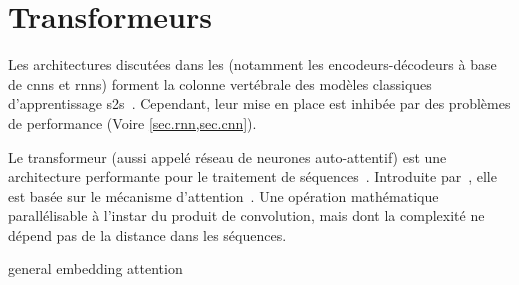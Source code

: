 \section{Transformeurs}

Les architectures discutées dans les 
(notamment les encodeurs-décodeurs à base de \glspl{cnn} et \glspl{rnn}) 
forment la colonne vertébrale des modèles classiques d'apprentissage \gls{s2s}~\cite{deep-nmt-survey}.
Cependant, leur mise en place est inhibée par des problèmes de performance 
(Voire \cref{sec.rnn,sec.cnn}).

Le transformeur (aussi appelé réseau de neurones auto-attentif) est une architecture performante pour le traitement de séquences~\cite{Shim_Sung_2022}.
Introduite par~\cite{attention}, elle est basée sur le mécanisme d'attention~\cite{Larochelle_Hinton_2010}.
Une opération mathématique parallélisable à l'instar du produit de convolution, 
mais dont la complexité ne dépend pas de la distance dans les séquences.



{general}
{embedding}
{attention}